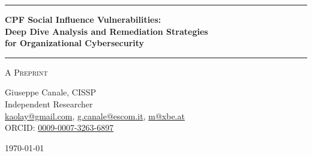 \documentclass[11pt,a4paper]{article}
\begin{document}
\thispagestyle{empty}
\begin{center}

\vspace*{0.5cm}

\rule{\textwidth}{1.5pt}

\vspace{0.5cm}

{\LARGE \textbf{CPF Social Influence Vulnerabilities:}}\\[0.3cm]
{\LARGE \textbf{Deep Dive Analysis and Remediation Strategies}}\\[0.3cm]
{\LARGE \textbf{for Organizational Cybersecurity}}

\vspace{0.5cm}

\rule{\textwidth}{1.5pt}

\vspace{0.3cm}

{\large \textsc{A Preprint}}

\vspace{0.5cm}

{\Large Giuseppe Canale, CISSP}\\[0.2cm]
Independent Researcher\\[0.1cm]
\href{mailto:kaolay@gmail.com}{kaolay@gmail.com}, 
\href{mailto:g.canale@escom.it}{g.canale@escom.it}, 
\href{mailto:m8xbe.at}{m@xbe.at}\\[0.1cm]
ORCID: \href{https://orcid.org/0009-0007-3263-6897}{0009-0007-3263-6897}

\vspace{0.8cm}

{\large \today}

\vspace{1cm}

\end{center}
\end{document}
